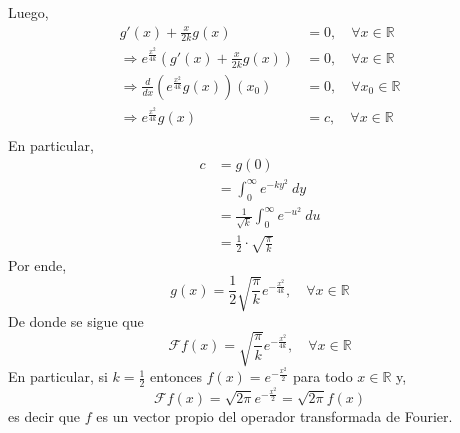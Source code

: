 \documentclass[12pt]{report}
\theoremstyle{largebreak}
\newcommand{\fou}[1]{\ensuremath{\mathcal{F}#1}}
\begin{document}
\begin{exa}
        Luego, 
        \begin{equation*}
            \begin{split}
                g'(x)+\frac{x}{2k}g(x)&=0,\quad\forall x\in\mathbb{R}\\
                \Rightarrow e^{\frac{x^2}{4k}}\left(g'(x)+\frac{x}{2k}g(x)\right)&=0,\quad\forall x\in\mathbb{R}\\
                \Rightarrow \frac{d}{dx}\left(e^{\frac{x^2}{4k}}g(x) \right)(x_0)&=0,\quad\forall x_0\in\mathbb{R} \\
                \Rightarrow e^{\frac{x^2}{4k}}g(x)&=c,\quad\forall x\in\mathbb{R}\\
            \end{split}
        \end{equation*}
        En particular,
        \begin{equation*}
            \begin{split}
                c&=g(0)\\
                &=\int_0^\infty e^{ -ky^2}\:dy\\
                &=\frac{1}{\sqrt{k}}\int_0^\infty e^{-u^2}\:du\\
                &=\frac{1}{2}\cdot\sqrt{\frac{\pi}{k}}
            \end{split}
        \end{equation*}
        Por ende,
        \begin{equation*}
            g(x)=\frac{1}{2}\sqrt{\frac{\pi}{k}}e^{ -\frac{x^2}{4k}},\quad\forall x\in\mathbb{R}
        \end{equation*}
        De donde se sigue que
        \begin{equation*}
            \fou{f}(x)=\sqrt{\frac{\pi}{k}}e^{ -\frac{x^2}{4k}}, \quad\forall x\in\mathbb{R}
        \end{equation*}
        En particular, si $k=\frac{1}{2}$ entonces $f(x)=e^{-\frac{x^2}{2}}$ para todo $x\in\mathbb{R}$ y,
        \begin{equation*}
            \fou{f}(x)=\sqrt{2\pi}e^{ -\frac{x^2}{2}}=\sqrt{2\pi}f(x)
        \end{equation*}
        es decir que $f$ es un vector propio del operador transformada de Fourier.
    \end{exa}
\end{document}
